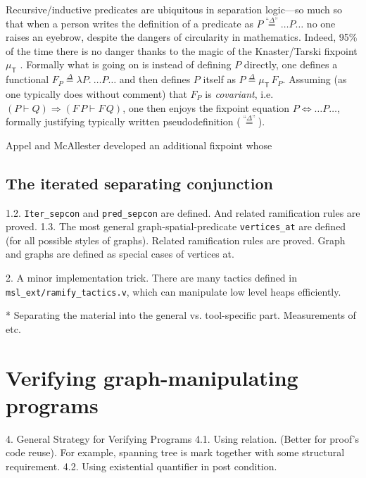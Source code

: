 \documentclass[pldi]{sigplanconf-pldi15}
\begin{document}

Recursive/inductive predicates are ubiquitous in separation logic---so much so that when a person writes the definition of a
predicate as $P \stackrel{\textrm{``}\Delta\textrm{''}}{=} \ldots P \ldots$ no one raises an eyebrow, despite the dangers of circularity in
mathematics.  Indeed, 95\% of the time there is no danger thanks to the magic of the Knaster/Tarski fixpoint $\mu_{\mathsf{T}}$ \cite{tarski:fixpoint}.
Formally what is going on is instead of defining $P$ directly, one defines a functional
$F_P \stackrel{\Delta}{=} \lambda P.~ \ldots P \ldots$ and then defines $P$ itself as $P \stackrel{\Delta}{=} \mu_{\mathsf{T}} \, F_P$.
Assuming (as one typically does without comment) that $F_P$ is \emph{covariant}, i.e. $(P \vdash Q) \Rightarrow (F \, P \vdash F \, Q)$,
one then enjoys the fixpoint equation
$P \Leftrightarrow \ldots P \ldots$, formally justifying typically written pseudodefinition ($\stackrel{\textrm{``}\Delta\textrm{''}}{=}$).





Appel and McAllester developed an additional fixpoint \cite{appel:fixpoint} whose \cite{appel:vmm}

\subsection{The iterated separating conjunction}
1.2. \texttt{Iter\_sepcon} and \texttt{pred\_sepcon} are defined. And related ramification rules are proved.
1.3. The most general graph-spatial-predicate \texttt{vertices\_at} are defined (for all possible styles of graphs). Related ramification rules are proved. Graph and graphs are defined as special cases of vertices at.

2. A minor implementation trick. There are many tactics defined in \texttt{msl\_ext/ramify\_tactics.v}, which can manipulate low level heaps efficiently.

* Separating the material into the general vs. tool-specific part.  Measurements of etc.

\section{Verifying graph-manipulating programs}

4. General Strategy for Verifying Programs
4.1. Using relation. (Better for proof's code reuse). For example, spanning tree is mark together with some structural requirement.
4.2. Using existential quantifier in post condition.
\end{document}
